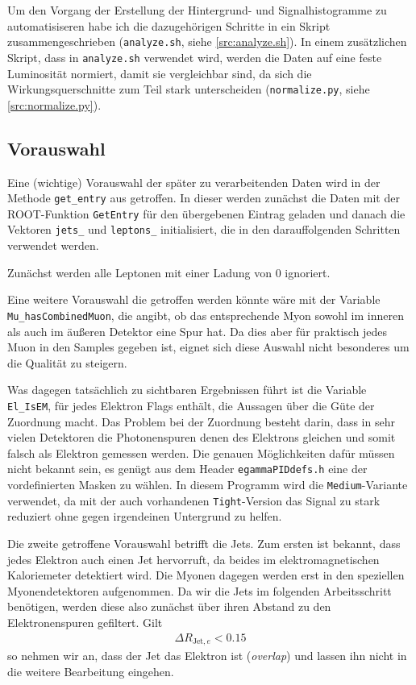 Um den Vorgang der Erstellung der Hintergrund- und Signalhistogramme zu
automatisiseren habe ich die dazugehörigen Schritte in ein Skript
zusammengeschrieben (\verb'analyze.sh', siehe \ref{src:analyze.sh}). In einem
zusätzlichen Skript, dass in \verb'analyze.sh' verwendet wird, werden die Daten
auf eine feste Luminosität normiert, damit sie vergleichbar sind, da sich die
Wirkungsquerschnitte zum Teil stark unterscheiden (\verb'normalize.py', siehe
\ref{src:normalize.py}).

\subsection{Vorauswahl}
Eine (wichtige) Vorauswahl der später zu verarbeitenden Daten wird in der
Methode \lstinline'get_entry' aus  getroffen. In dieser werden
zunächst die Daten mit der ROOT-Funktion \lstinline'GetEntry' für den
übergebenen Eintrag geladen und danach die Vektoren \lstinline'jets_' und
\lstinline'leptons_' initialisiert, die in den darauffolgenden Schritten
verwendet werden.

Zunächst werden alle Leptonen mit einer Ladung von $0$ ignoriert.

Eine weitere Vorauswahl die getroffen werden könnte wäre mit der Variable
\lstinline'Mu_hasCombinedMuon', die angibt, ob das entsprechende Myon sowohl im
inneren als auch im äußeren Detektor eine Spur hat. Da dies aber für praktisch
jedes Muon in den Samples gegeben ist, eignet sich diese Auswahl nicht
besonderes um die Qualität zu steigern.

Was dagegen tatsächlich zu sichtbaren Ergebnissen führt ist die Variable
\lstinline'El_IsEM', für jedes Elektron Flags enthält, die Aussagen über die
Güte der Zuordnung macht. Das Problem bei der Zuordnung besteht darin, dass in
sehr vielen Detektoren die Photonenspuren denen des Elektrons gleichen und somit
falsch als Elektron gemessen werden. Die genauen Möglichkeiten dafür müssen
nicht bekannt sein, es genügt aus dem Header \texttt{egammaPIDdefs.h} eine der
vordefinierten Masken zu wählen. In diesem Programm wird die
\lstinline'Medium'-Variante verwendet, da mit der auch vorhandenen
\lstinline'Tight'-Version das Signal zu stark reduziert ohne gegen irgendeinen
Untergrund zu helfen.


Die zweite getroffene Vorauswahl betrifft die Jets. Zum ersten ist bekannt, dass
jedes Elektron auch einen Jet hervorruft, da beides im elektromagnetischen
Kaloriemeter detektiert wird. Die Myonen dagegen werden erst in den speziellen
Myonendetektoren aufgenommen. Da wir die Jets im folgenden Arbeitsschritt
benötigen, werden diese also zunächst über ihren Abstand zu den Elektronenspuren
gefiltert. Gilt
\begin{align}
  \Delta R_{\text{Jet},e} < 0.15
\end{align}
so nehmen wir an, dass der Jet das Elektron ist (\emph{overlap}) und lassen ihn
nicht in die weitere Bearbeitung eingehen.

